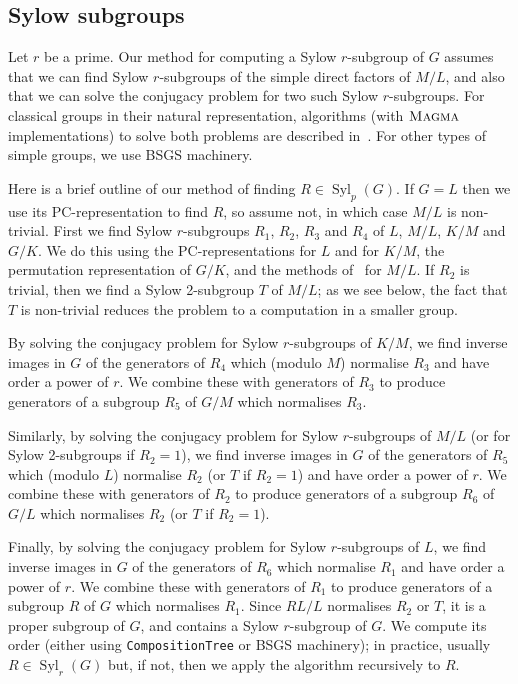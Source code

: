 \documentclass[12pt,twoside,reqno,psamsfonts]{amsproc}
\numberwithin{equation}{section}
\numberwithin{figure}{section}
\newcounter{algorithm}
\theoremstyle{plain}
\theoremstyle{definition}
\theoremstyle{remark}
\newcommand{\MAGMA}{\textsc{Magma}}
\DeclareMathOperator{\Syl}{Syl}
\begin{document}
\subsection{Sylow subgroups}\label{subsec:sylow} 
Let $r$ be a prime. Our method for computing a Sylow $r$-subgroup of $G$
assumes that we can find Sylow $r$-subgroups of the simple direct factors 
of $M/L$, and also that we can solve the conjugacy problem for two
such  Sylow $r$-subgroups.
For classical groups in their natural representation, 
algorithms (with $\MAGMA$
implementations) to solve both problems are described
in~\cite{stather07}. For other types of simple groups, 
we use BSGS machinery.

Here is a brief outline of our method of finding $R \in \Syl_p(G)$.
If $G=L$ then we use its PC-representation to find $R$, so assume not,
in which case $M/L$ is non-trivial.  First we find Sylow $r$-subgroups
$R_1$, $R_2$, $R_3$ and $R_4$ of $L$, $M/L$, $K/M$ and $G/K$.
We do this using the PC-representations for $L$ and for $K/M$,
the permutation representation of $G/K$, and the methods 
of~\cite{stather07}
for $M/L$. %
If $R_2$ is trivial, then we find a Sylow 2-subgroup $T$ of $M/L$;
as we see below, the fact that $T$ is non-trivial reduces 
the problem to a computation in a smaller group.

By solving the conjugacy problem
for Sylow $r$-subgroups of $K/M$, we find inverse images in $G$ of
the generators of $R_4$ which (modulo $M$) normalise $R_3$ and have order
a power of $r$. We combine these with generators of $R_3$ to produce
generators of a subgroup $R_5$ of $G/M$ which normalises $R_3$.

Similarly, by solving the conjugacy problem for Sylow $r$-subgroups of
$M/L$ (or for Sylow 2-subgroups if $R_2=1$), we find inverse
images in $G$ of the generators of $R_5$ which (modulo $L$) normalise $R_2$
(or $T$ if $R_2=1$) and have order a power of $r$. We combine these with
generators of $R_2$ to produce generators of a subgroup $R_6$ of $G/L$ which
normalises $R_2$ (or $T$ if $R_2=1$).

Finally, by solving the conjugacy problem for Sylow $r$-subgroups of
$L$, we find inverse images in $G$ of the generators of $R_6$ which
normalise $R_1$ and have order a power of $r$. We combine these with
generators of $R_1$ to produce generators of a subgroup $R$ of $G$ which
normalises $R_1$. Since $RL/L$ normalises $R_2$ or $T$, it is
a proper subgroup of $G$, and contains a Sylow $r$-subgroup of $G$.
We compute its order 
(either using {\tt CompositionTree} or BSGS machinery);
in practice, usually $R \in \Syl_r(G)$ but, if not, then we apply the 
algorithm recursively to $R$.
\end{document}
